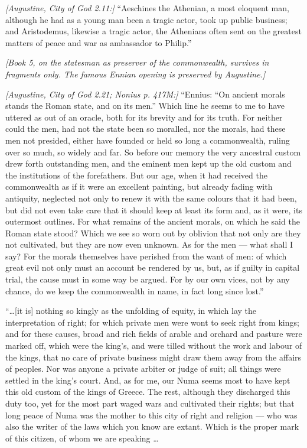  \textit{[Augustine, City of God 2.11:]} ``Aeschines the Athenian, a most eloquent man, although he had as a young man been a tragic actor, took up public business; and Aristodemus, likewise a tragic actor, the Athenians often sent on the greatest matters of peace and war as ambassador to Philip.''


\noindent\textit{[Book 5, on the statesman as preserver of the commonwealth, survives in fragments only. The famous Ennian opening is preserved by Augustine.]}

 \textit{[Augustine, City of God 2.21; Nonius p. 417M:]} ``Ennius: ``On ancient morals stands the Roman state, and on its men.'' Which line he seems to me to have uttered as out of an oracle, both for its brevity and for its truth. For neither could the men, had not the state been so moralled, nor the morals, had these men not presided, either have founded or held so long a commonwealth, ruling over so much, so widely and far. So before our memory the very ancestral custom drew forth outstanding men, and the eminent men kept up the old custom and the institutions of the forefathers. But our age, when it had received the commonwealth as if it were an excellent painting, but already fading with antiquity, neglected not only to renew it with the same colours that it had been, but did not even take care that it should keep at least its form and, as it were, its outermost outlines. For what remains of the ancient morals, on which he said the Roman state stood? Which we see so worn out by oblivion that not only are they not cultivated, but they are now even unknown. As for the men --- what shall I say? For the morals themselves have perished from the want of men: of which great evil not only must an account be rendered by us, but, as if guilty in capital trial, the cause must in some way be argued. For by our own vices, not by any chance, do we keep the commonwealth in name, in fact long since lost.''

 ``\ldots [it is] nothing so kingly as the unfolding of equity, in which lay the interpretation of right; for which private men were wont to seek right from kings; and for these causes, broad and rich fields of arable and orchard and pasture were marked off, which were the king's, and were tilled without the work and labour of the kings, that no care of private business might draw them away from the affairs of peoples. Nor was anyone a private arbiter or judge of suit; all things were settled in the king's court. And, as for me, our Numa seems most to have kept this old custom of the kings of Greece. The rest, although they discharged this duty too, yet for the most part waged wars and cultivated their rights; but that long peace of Numa was the mother to this city of right and religion --- who was also the writer of the laws which you know are extant. Which is the proper mark of this citizen, of whom we are speaking \ldots

